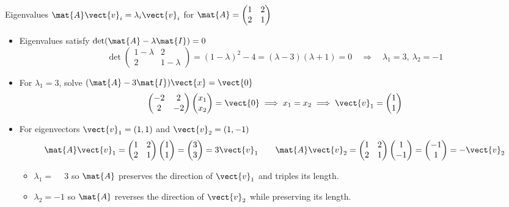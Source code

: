 \begin{frame}{Eigenvalues 
		$\mat{A} \vect{v}_i = \lambda_i \vect{v}_i$ \quad for \quad $\mat{A}=\begin{pmatrix}1&2\\2&1\end{pmatrix}$}
\begin{itemize}
  \setlength{\abovedisplayskip}{3pt}
  \setlength{\belowdisplayskip}{3pt}
  \setlength{\abovedisplayshortskip}{3pt}
  \setlength{\belowdisplayshortskip}{3pt}
  \setlength{\itemsep}{0pt}
  \item Eigenvalues satisfy $\det(\mat{A}-\lambda\mat{I})=0$
  \[
    \det\begin{pmatrix}1-\lambda&2\\2&1-\lambda\end{pmatrix}
    =(1-\lambda)^2-4=(\lambda-3)(\lambda+1)=0
    \quad\Longrightarrow\quad
    \lambda_1=3,\ \lambda_2=-1
  \]
  \item For $\lambda_1=3$, solve $(\mat{A}-3\mat{I})\vect{x}=\vect{0}$
  \[
    \begin{pmatrix}-2&2\\2&-2\end{pmatrix}
    \begin{pmatrix}x_1\\x_2\end{pmatrix}=\vect{0}
    \;\Longrightarrow\; x_1=x_2
    \;\Longrightarrow\; \vect{v}_1=\begin{pmatrix}1\\1\end{pmatrix}
  \]
  \item For eigenvectors $\vect{v}_1=(1,1)$ and $\vect{v}_2=(1,-1)$
  \[
    \mat{A}\vect{v}_1=
    \begin{pmatrix}1&2\\2&1\end{pmatrix}\begin{pmatrix}1\\1\end{pmatrix}
    =\begin{pmatrix}3\\3\end{pmatrix}=3\vect{v}_1
    \qquad
    \mat{A}\vect{v}_2=
    \begin{pmatrix}1&2\\2&1\end{pmatrix}\begin{pmatrix}1\\-1\end{pmatrix}
    =\begin{pmatrix}-1\\1\end{pmatrix}=-\vect{v}_2
  \]
  \begin{itemize}
    \setlength{\itemsep}{0pt}
    \item $\boxed{\lambda_1=\phantom{-}3}$ so $\mat{A}$ preserves the direction of $\vect{v}_1$ and triples  its length. 
    \item $\boxed{\lambda_2=-1}$ so $\mat{A}$ reverses the direction of $\vect{v}_2$ while preserving its length. 
  \end{itemize}
\end{itemize}
\end{frame}
